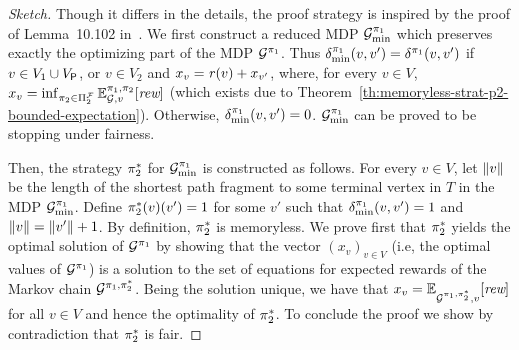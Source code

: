 \begin{proof}[Sketch]
  Though it differs in the details, the proof strategy is inspired by
  the proof of Lemma~10.102 in~\cite{BaierK08}.
  We first construct a reduced MDP $\mathcal{G}^{\pi_{1}}_{\min}$ which
  preserves exactly the optimizing part of the MDP
  $\mathcal{G}^{\pi_{1}}$.
  Thus $\delta^{\pi_{1}}_{\min}(v,v')=\delta^{\pi_{1}}(v,v')$ if
  $v\in V_1\cup V_{\mathsf{P}}$, or $v\in V_2$ and
  $x_v=\mathit{r}(v)+x_{v'}$, where, for every $v\in V$,
  $x_v = \inf_{\pi_{2} \in \Pi^{\mathcal{F}}_{2}} \mathbb{E}^{\pi_{1}, \pi_{2}}_{\mathcal{G},v}[\textit{rew}]$
  (which exists due to Theorem~\ref{th:memoryless-strat-p2-bounded-expectation}).
  Otherwise, $\delta^{\pi_{1}}_{\min}(v,v')=0$.
  $\mathcal{G}^{\pi_{1}}_{\min}$ can be proved to be stopping under fairness.

  Then, the strategy $\pi^*_{2}$ for
  $\mathcal{G}^{\pi_{1}}_{\min}$ is constructed as follows.  For every
  $v\in V$, let ${\lVert{v}\rVert}$ be the length of the shortest path
  fragment to some terminal vertex in $T$ in the MDP
  $\mathcal{G}^{\pi_{1}}_{\min}$.  Define $\pi^*_{2}(v)(v')=1$
  for some $v'$ such that $\delta^{\pi_{1}}_{\min}(v,v')=1$ and
  ${\lVert{v}\rVert}={\lVert{v'}\rVert}+1$.
  By definition, $\pi^*_{2}$ is  memoryless.  We prove first that
  $\pi^*_{2}$ yields the optimal solution of
  $\mathcal{G}^{\pi_{1}}$ by showing that the vector $(x_v)_{v\in V}$
  (i.e, the optimal values of $\mathcal{G}^{\pi_{1}}$) is a solution to
  the set of equations for expected rewards of the Markov chain
  $\mathcal{G}^{\pi_{1},\pi^*_{2}}$.  Being the solution unique,
  we have that
  $x_v=\mathbb{E}^{}_{\mathcal{G}^{\pi_{1},\pi^*_{2}},v}[\textit{rew}]$
  for all $v\in V$ and hence the optimality of $\pi^*_{2}$.
  To conclude the proof we show by contradiction that
  $\pi^*_{2}$ is fair.
\qedhere
\end{proof}
\fi
